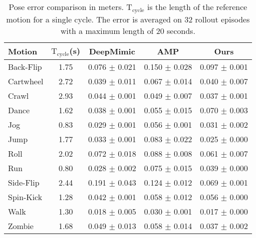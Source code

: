 \begin{table}[t]
\caption{Pose error comparison in meters.  $\textrm{T}_\textrm{cycle}$ is the length of the reference motion for a single cycle. The error is averaged on 32 rollout episodes with a maximum length of 20 seconds.}
\fontsize{8.8}{9}\selectfont
\begin{center}
\begin{tabular}{lcccc}
\toprule
Motion & $\textrm{T}_\textrm{cycle}$(s) &  DeepMimic & AMP & Ours\\
\midrule
Back-Flip & 1.75 & 0.076 $\pm$ 0.021 & 0.150 $\pm$ 0.028 & 0.097 $\pm$ 0.001 \\
Cartwheel & 2.72 & 0.039 $\pm$ 0.011 & 0.067 $\pm$ 0.014 & 0.040 $\pm$ 0.007 \\
Crawl & 2.93 & 0.044 $\pm$ 0.001 & 0.049 $\pm$ 0.007 & 0.037 $\pm$ 0.001 \\
Dance & 1.62 & 0.038 $\pm$ 0.001 & 0.055 $\pm$ 0.015 & 0.070 $\pm$ 0.003 \\
Jog & 0.83 & 0.029 $\pm$ 0.001 & 0.056 $\pm$ 0.001 & 0.031 $\pm$ 0.002 \\
Jump & 1.77 & 0.033 $\pm$ 0.001 & 0.083 $\pm$ 0.022 & 0.025 $\pm$ 0.000 \\
Roll & 2.02 & 0.072 $\pm$ 0.018 & 0.088 $\pm$ 0.008 & 0.061 $\pm$ 0.007 \\
Run & 0.80 & 0.028 $\pm$ 0.002 & 0.075 $\pm$ 0.015 & 0.039 $\pm$ 0.000 \\
Side-Flip & 2.44 & 0.191 $\pm$ 0.043 & 0.124 $\pm$ 0.012 & 0.069 $\pm$ 0.001\\
Spin-Kick & 1.28 & 0.042 $\pm$ 0.001 & 0.058 $\pm$ 0.012 & 0.056 $\pm$ 0.000\\
Walk & 1.30 & 0.018 $\pm$ 0.005 & 0.030 $\pm$ 0.001 &  0.017 $\pm$ 0.000 \\
Zombie & 1.68 & 0.049 $\pm$ 0.013 & 0.058 $\pm$ 0.014 & 0.037 $\pm$ 0.002 \\
\bottomrule
\end{tabular}
\label{poseerror}
\end{center}
\end{table}

